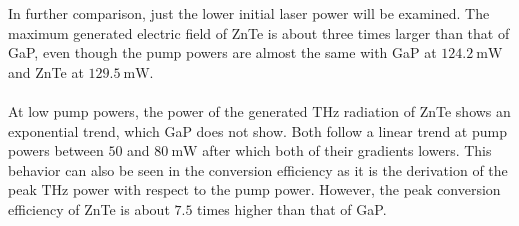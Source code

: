 In further comparison, just the lower initial laser power will be examined.
The maximum generated electric field of ZnTe is about three times larger than that of GaP, even though the pump powers are almost the same with GaP at $\SI{124.2}{\milli\W}$ and ZnTe at $\SI{129.5}{\milli\W}$.
\\\\
At low pump powers, the power of the generated $\si{\tera\hertz}$ radiation of ZnTe shows an exponential trend, which GaP does not show.
Both follow a linear trend at pump powers between $50$ and $\SI{80}{\milli\W}$ after which both of their gradients lowers.
This behavior can also be seen in the conversion efficiency as it is the derivation of the peak $\si{\tera\hertz}$ power with respect to the pump power.
However, the peak conversion efficiency of ZnTe is about $7.5$ times higher than that of GaP. 